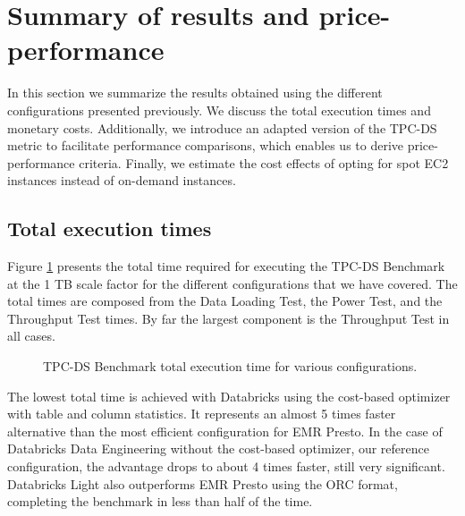 \section{Summary of results and price-performance}\label{resultsSummary}

In this section we summarize the results obtained using the different configurations presented previously. We discuss the total execution times and monetary costs. Additionally, we introduce an adapted version of the TPC-DS metric to facilitate performance comparisons, which enables us to derive price-performance criteria. Finally, we estimate the cost effects of opting for spot EC2 instances instead of on-demand instances.

\subsection{Total execution times}\label{resultsSummaryTotalExecutionTimes}

Figure \ref{fig:resultsSummaryTotalTimes} presents the total time required for executing the TPC-DS Benchmark at the 1 TB scale factor for the different configurations that we have covered. The total times are composed from the Data Loading Test, the Power Test, and the Throughput Test times. By far the largest component is the Throughput Test in all cases.

\begin{figure}
   \begin{center}
   \end{center}
   \caption{TPC-DS Benchmark total execution time for various configurations.}
   \label{fig:resultsSummaryTotalTimes}
\end{figure}

The lowest total time is achieved with Databricks using the cost-based optimizer with table and column statistics. It represents an almost 5 times faster alternative than the most efficient configuration for EMR Presto. In the case of Databricks Data Engineering without the cost-based optimizer, our reference configuration, the advantage drops to about 4 times faster, still very significant. Databricks Light also outperforms EMR Presto using the ORC format, completing the benchmark in less than half of the time.

